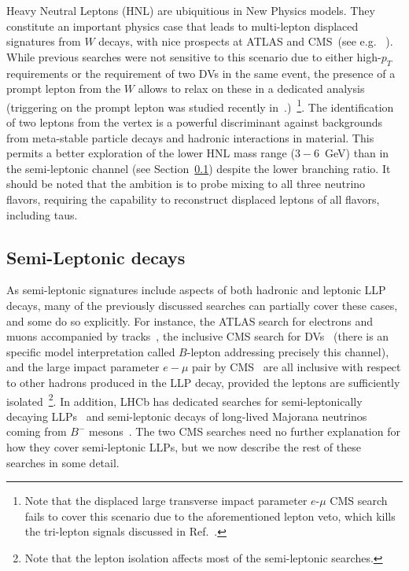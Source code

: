  Heavy Neutral Leptons (HNL) are ubiquitious in New Physics models. They constitute an  important physics case that leads to multi-lepton displaced signatures from $W$ decays, with nice prospects at ATLAS and CMS~(see e.g.~ \cite{Izaguirre2015,Nemevsek:2018bbt,Cottin:2018kmq}). While previous searches were not sensitive to this scenario due to either high-$p_T$ requirements or the requirement of two DVs in the same event, the presence of a prompt lepton from the $W$ allows to relax on these in a dedicated analysis (triggering on the prompt lepton was studied recently in~\cite{Cottin:2018kmq}.)~\footnote{Note that the displaced large transverse impact parameter $e$-$\mu$ CMS search~\cite{CMS-PAS-EXO-16-022} fails to cover this scenario due to the aforementioned lepton veto, which kills the tri-lepton signals discussed in Ref.~\cite{Izaguirre2015}. }. 
The identification of two leptons from the vertex is a powerful discriminant against backgrounds from meta-stable particle decays and hadronic interactions in material. This permits a better exploration of the lower HNL mass range ($3-6$~GeV) than in the semi-leptonic channel (see Section~\ref{subsec:dsemilep}) despite the lower branching ratio. It should be noted that the ambition is to probe mixing to all three neutrino flavors, requiring the capability to reconstruct displaced leptons of all flavors, including taus. 

\subsection{Semi-Leptonic decays}
\label{subsec:dsemilep}

As semi-leptonic signatures include aspects of both hadronic and leptonic LLP decays, many of the previously discussed searches can partially cover these cases, and some do so explicitly. For instance, the ATLAS search for electrons and muons accompanied by tracks~\cite{Aad:2015rba}, the inclusive CMS search for DVs~\cite{CMS:2017oor} (there is an specific model interpretation called $B$-lepton addressing precisely this channel), and the large impact parameter $e-\mu$ pair by CMS~\cite{CMS-PAS-EXO-16-022} are all inclusive with respect to other hadrons produced in the LLP decay, provided the leptons are sufficiently isolated~\footnote{Note that the lepton isolation affects most of the semi-leptonic searches.}. In addition, LHCb has dedicated searches for semi-leptonically decaying  LLPs~\cite{Aaij:2016xmb} and semi-leptonic decays of long-lived Majorana neutrinos coming from $B^{-}$ mesons~\cite{Aaij:2014aba}.   The two CMS searches \cite{CMS:2017oor,CMS-PAS-EXO-16-022} need no further explanation for how they cover semi-leptonic LLPs, but we now describe the rest of these searches in some detail.    

